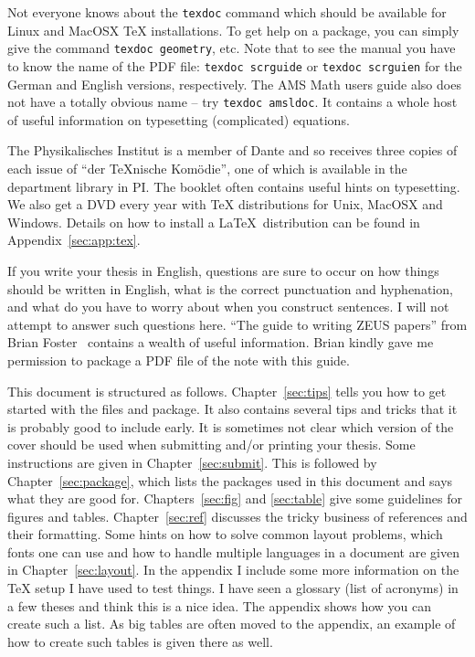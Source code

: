 Not everyone knows about the \texttt{texdoc} command
which should be available for Linux and MacOSX \TeX{} installations. To get help
on a package, you can simply give the command \texttt{texdoc
  geometry}, etc. Note that to see the \KOMAScript{} manual you have
to know the name of the PDF file: \texttt{texdoc scrguide} or
\texttt{texdoc scrguien} for the German and English versions,
respectively. The AMS Math users guide also does not have a totally
obvious name -- try \texttt{texdoc amsldoc}. It
contains a whole host of useful information on typesetting
(complicated) equations.

The Physikalisches Institut is a member of Dante and so receives three
copies of each issue of \foreignquote{ngerman}{der TeXnische Komödie},
one of which is available in the department library in PI.  The
booklet often contains useful hints on typesetting. We also get a DVD
every year with \TeX{}
distributions for Unix, MacOSX and Windows. Details on how to install
a \LaTeX\ distribution can be found in Appendix~\ref{sec:app:tex}.

If you write your thesis in English, questions are sure
to occur on how things should be written in English, what is the
correct punctuation and hyphenation, and what do you have to worry
about when you construct sentences. I will not attempt to answer such
questions here. \enquote{The guide to writing ZEUS
  papers} from Brian Foster~\cite{ZEUSGuide}
contains a wealth of useful information. Brian kindly gave me
permission to package a PDF file of the note with this guide.

This document is structured as follows. Chapter~\ref{sec:tips} tells
you how to get started with the files and package. It also contains
several tips and tricks that it is probably good to include early. It
is sometimes not clear which version of the cover should be used when
submitting and/or printing your thesis. Some instructions are given in
Chapter~\ref{sec:submit}.  This is followed by
Chapter~\ref{sec:package}, which lists the packages used in this
document and says what they are good for. Chapters~\ref{sec:fig} and
\ref{sec:table} give some guidelines for figures and
tables. Chapter~\ref{sec:ref} discusses the tricky business of
references and their formatting. Some hints on how to solve common
layout problems, which fonts one can use and how to handle multiple
languages in a document are given in Chapter~\ref{sec:layout}. 
In the appendix I include some more
information on the \TeX{} setup I have used to test things. I have
seen a glossary (list of acronyms) in a few theses and think this is a
nice idea. The appendix shows how you can create such a list.
As big
tables are often moved to the appendix, an example of how to create
such tables is given there as well.


